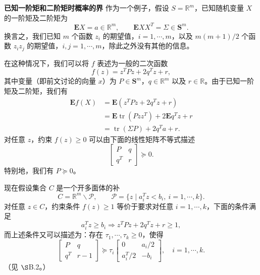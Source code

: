 \documentclass[UTF8,12pt,a4paper,fontset=fandol]{ctexart}
\begin{document}
\noindent\textbf{已知一阶矩和二阶矩时概率的界}\quad
作为一个例子，假设 $S=\mathbb{R}^m$，已知随机变量 $X$ 的一阶矩及二阶矩为
\[
\mathbf{E}X=a\in\mathbb{R}^m,\qquad
\mathbf{E}XX^T=\Sigma\in\mathbf{S}^m.
\]
换言之，我们已知 $m$ 个函数 $z_i$ 的期望值，$i=1,\cdots,m$，以及 $m(m+1)/2$ 个函数 $z_iz_j$ 的期望值，$i,j=1,\cdots,m$，除此之外没有其他的信息。

在这种情况下，我们可以将 $f$ 表述为一般的二次函数
\[
f(z)=z^TPz+2q^Tz+r,
\]
其中变量（即前文讨论的向量 $x$）为 $P\in\mathbf{S}^m$，$q\in\mathbb{R}^m$ 以及 $r\in\mathbb{R}$。由于已知一阶矩及二阶矩，我们有
\[
\begin{aligned}
\mathbf{E}f(X)&=\mathbf{E}(z^TPz+2q^Tz+r)\\
&=\mathbf{E}\operatorname{tr}(Pzz^T)+2\mathbf{E}q^Tz+r\\
&=\operatorname{tr}(\Sigma P)+2q^Ta+r.
\end{aligned}
\]
对任意 $z$，约束 $f(z)\geq 0$ 可以由下面的线性矩阵不等式描述
\[
\begin{bmatrix}
P & q\\
q^T & r
\end{bmatrix}\succeq 0.
\]
特别地，我们有 $P\succeq 0$。

现在假设集合 $C$ 是一个开多面体的补
\[
C=\mathbb{R}^m\backslash\mathcal{P},\qquad
\mathcal{P}=\{z\mid a_i^Tz<b_i,\ i=1,\cdots,k\}.
\]
对任意 $z\in C$，约束条件 $f(z)\geq 1$ 等价于要求对任意 $i=1,\cdots,k$，下面的条件满足
\[
a_i^Tz\geq b_i\Longrightarrow z^TPz+2q^Tz+r\geq 1,
\]
而上述条件又可以描述为：存在 $\tau_1,\cdots,\tau_k\geq 0$，使得
\[
\begin{bmatrix}
P & q\\
q^T & r-1
\end{bmatrix}\succeq
\tau_i
\begin{bmatrix}
0 & a_i/2\\
a_i^T/2 & -b_i
\end{bmatrix},
\quad i=1,\cdots,k.
\]
（见 $\S$B.2。）
\end{document}
